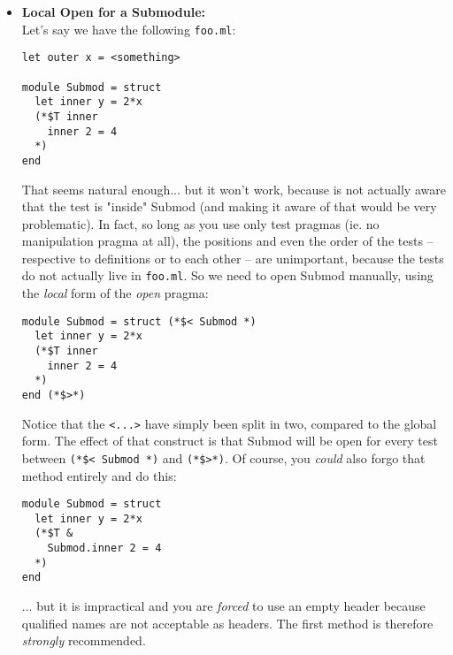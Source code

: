 \begin{itemize}
\item \textbf{Local Open for a Submodule:}\\
 Let's say we have the following \texttt{foo.ml}:
\begin{verbatim}
let outer x = <something>

module Submod = struct
  let inner y = 2*x
  (*$T inner
    inner 2 = 4
  *)
end
\end{verbatim}
That seems natural enough... but it won't work, because \qtest{} is not actually aware that
the test is "inside" Submod (and making it aware of that would be very problematic). In
fact, so long as you use only test pragmas (ie. no manipulation pragma at all), the
positions and even the order of the tests -- respective to definitions or to each other --
are unimportant, because the tests do not actually live in \texttt{foo.ml}. So we need to open
Submod manually, using the \emph{local} form of the \emph{open} pragma:
\begin{verbatim}
module Submod = struct (*$< Submod *)
  let inner y = 2*x
  (*$T inner
    inner 2 = 4
  *)
end (*$>*)
\end{verbatim}
Notice that the \texttt{<...>} have simply been split in two, compared to the global form.
The effect of that construct is that Submod will be open for every test between
\texttt{(*\$< Submod *)} and \texttt{(*\$>*)}.
Of course, you \emph{could} also forgo that method entirely and do this:
\begin{verbatim}
module Submod = struct
  let inner y = 2*x
  (*$T &
    Submod.inner 2 = 4
  *)
end
\end{verbatim}
... but it is impractical and you are \emph{forced} to use an empty header because qualified
names are not acceptable as headers. The first method is therefore \emph{strongly} recommended.
\end{itemize}
